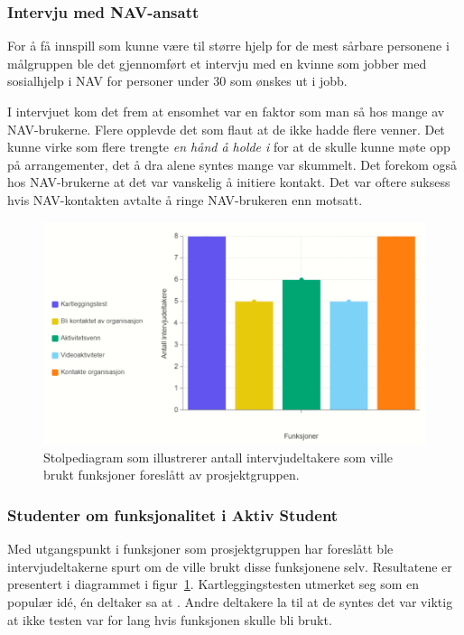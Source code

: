 \subsubsection{Intervju med NAV-ansatt}
For å få innspill som kunne være til større hjelp for de mest sårbare personene i målgruppen ble det gjennomført et intervju med en kvinne som jobber med sosialhjelp i NAV for personer under 30 som ønskes ut i jobb. 

I intervjuet kom det frem at ensomhet var en faktor som man så hos mange av NAV-brukerne. Flere opplevde det som flaut at de ikke hadde flere venner. Det kunne virke som flere trengte {\em  en hånd å holde i} for at de skulle kunne møte opp på arrangementer, det å dra alene syntes mange var skummelt. Det forekom også hos NAV-brukerne at det var vanskelig å initiere kontakt. Det var oftere suksess hvis NAV-kontakten avtalte å ringe NAV-brukeren enn motsatt.


\begin{figure}[H]
\includegraphics[width=\textwidth]{Illustrasjoner/diagram-funksjoner.png}
\caption{Stolpediagram som illustrerer antall intervjudeltakere som ville brukt funksjoner foreslått av prosjektgruppen.}
\label{fig:diagram-funksjoner}
\end{figure}

\subsubsection{Studenter om funksjonalitet i Aktiv Student}
Med utgangspunkt i funksjoner som prosjektgruppen har foreslått ble intervjudeltakerne spurt om de ville brukt disse funksjonene selv. Resultatene er presentert i diagrammet i figur~\ref{fig:diagram-funksjoner}. Kartleggingstesten utmerket seg som en populær idé, én deltaker sa at . Andre deltakere la til at de syntes det var viktig at ikke testen var for lang hvis funksjonen skulle bli brukt.

